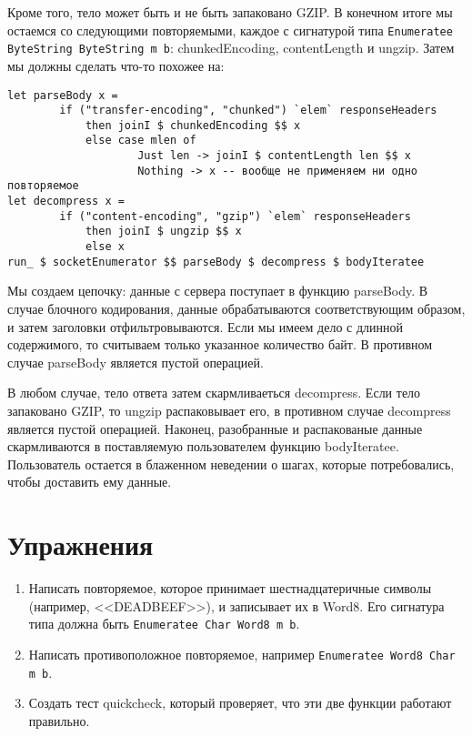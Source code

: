 Кроме того, тело может быть и не быть запаковано GZIP. В конечном итоге мы остаемся со следующими повторяемыми, каждое с сигнатурой типа \lstinline'Enumeratee ByteString ByteString m b': chunkedEncoding, contentLength и ungzip. Затем мы должны сделать что-то похожее на:

\begin{lstlisting}
let parseBody x =
        if ("transfer-encoding", "chunked") `elem` responseHeaders
            then joinI $ chunkedEncoding $$ x
            else case mlen of
                    Just len -> joinI $ contentLength len $$ x
                    Nothing -> x -- вообще не применяем ни одно повторяемое
let decompress x =
        if ("content-encoding", "gzip") `elem` responseHeaders
            then joinI $ ungzip $$ x
            else x
run_ $ socketEnumerator $$ parseBody $ decompress $ bodyIteratee
\end{lstlisting}%

Мы создаем цепочку: данные с сервера поступает в функцию parseBody. В случае блочного кодирования, данные обрабатываются соответствующим образом, и затем заголовки отфильтровываются. Если мы имеем дело с длинной содержимого, то считываем только указанное количество байт. В противном случае parseBody является пустой операцией.

В любом случае, тело ответа затем скармливаеться decompress. Если тело запаковано GZIP, то ungzip распаковывает его, в противном случае decompress является пустой операцией. Наконец, разобранные и распакованые данные скармливаются в поставляемую пользователем функцию bodyIteratee. Пользователь остается в блаженном неведении о шагах, которые потребовались, чтобы доставить ему данные.

\section{Упражнения}

\begin{enumerate}
\item Написать повторяемое, которое принимает шестнадцатеричные символы (например, <<DEADBEEF>>), и записывает их в Word8. Его сигнатура типа должна быть \lstinline'Enumeratee Char Word8 m b'.
\item Написать противоположное повторяемое, например \lstinline'Enumeratee Word8 Char m b'.
\item Создать тест quickcheck, который проверяет, что эти две функции работают правильно.
\end{enumerate}

